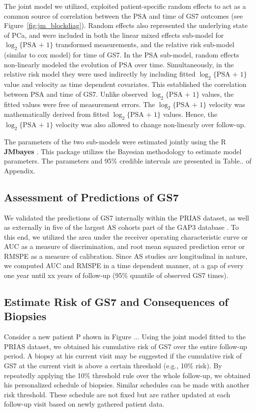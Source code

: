 The joint model we utilized, exploited patient-specific random effects \citep{laird1982random} to act as a common source of correlation between the PSA and time of GS7 outcomes (see Figure~\ref{fig:jm_blockdiag}). Random effects also represented the underlying state of PCa, and were included in both the linear mixed effects sub-model for $\log_2\{\mbox{PSA + 1}\}$ transformed measurements, and the relative risk sub-model (similar to cox model) for time of GS7. In the PSA sub-model, random effects non-linearly modeled the evolution of PSA over time. Simultaneously, in the relative risk model they were used indirectly by including fitted $\log_2\{\mbox{PSA + 1}\}$ value and velocity as time dependent covariates. This established the correlation between PSA and time of GS7. Unlike observed $\log_2\{\mbox{PSA + 1}\}$ values, the fitted values were free of measurement errors. The $\log_2\{\mbox{PSA + 1}\}$ velocity was mathematically derived from fitted $\log_2\{\mbox{PSA + 1}\}$ values. Hence, the $\log_2\{\mbox{PSA + 1}\}$ velocity was also allowed to change non-linearly over follow-up.

The parameters of the two sub-models were estimated jointly using the R \textbf{JMbayes} \citep{rizopoulosJMbayes}. This package utilizes the Bayesian methodology to estimate model parameters. The parameters and 95\% credible intervals are presented in Table.. of Appendix.

\subsection{Assessment of Predictions of GS7}
We validated the predictions of GS7 internally within the PRIAS dataset, as well as externally in five of the largest AS cohorts part of the GAP3 database \citep{gap3_2018}. To this end, we utilized the area under the receiver operating characteristic curve or AUC \cite{rizopoulos2017dynamic} as a measure of discrimination, and root mean squared prediction error or RMSPE \cite{rizopoulos2017dynamic} as a measure of calibration. Since AS studies are longitudinal in nature, we computed AUC and RMSPE in a time dependent manner, at a gap of every one year until xx years of follow-up (95\% quantile of observed GS7 times).

\subsection{Estimate Risk of GS7 and Consequences of Biopsies}
Consider a new patient P shown in Figure ... Using the joint model fitted to the PRIAS dataset, we obtained his cumulative risk of GS7 over the entire follow-up period. A biopsy at his current visit may be suggested if the cumulative risk of GS7 at the current visit is above a certain threshold (e.g., 10\% risk). By repeatedly applying the 10\% threshold rule over the whole follow-up, we obtained his personalized schedule of biopsies. Similar schedules can be made with another risk threshold. These schedule are not fixed but are rather updated at each follow-up visit based on newly gathered patient data. 

